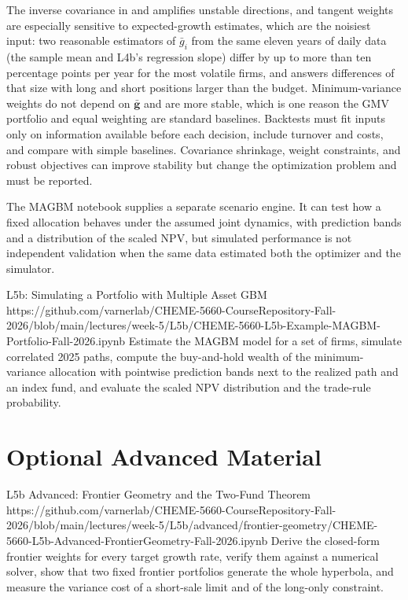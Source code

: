 \documentclass[11pt]{article}
\begin{document}
The inverse covariance in  and  amplifies unstable directions, and tangent weights are especially sensitive to expected-growth estimates, which are the noisiest input: two reasonable estimators of $\bar g_i$ from the same eleven years of daily data (the sample mean and L4b's regression slope) differ by up to more than ten percentage points per year for the most volatile firms, and  answers differences of that size with long and short positions larger than the budget. Minimum-variance weights do not depend on $\bar{\mathbf g}$ and are more stable, which is one reason the GMV portfolio and equal weighting are standard baselines. Backtests must fit inputs only on information available before each decision, include turnover and costs, and compare with simple baselines. Covariance shrinkage, weight constraints, and robust objectives can improve stability but change the optimization problem and must be reported.

The MAGBM notebook supplies a separate scenario engine. It can test how a fixed allocation behaves under the assumed joint dynamics, with prediction bands and a distribution of the scaled NPV, but simulated performance is not independent validation when the same data estimated both the optimizer and the simulator.

\notebooklink
  {L5b: Simulating a Portfolio with Multiple Asset GBM}
  {https://github.com/varnerlab/CHEME-5660-CourseRepository-Fall-2026/blob/main/lectures/week-5/L5b/CHEME-5660-L5b-Example-MAGBM-Portfolio-Fall-2026.ipynb}
  {Estimate the MAGBM model for a set of firms, simulate correlated 2025 paths, compute the buy-and-hold wealth of the minimum-variance allocation with pointwise prediction bands next to the realized path and an index fund, and evaluate the scaled NPV distribution and the trade-rule probability.}

\newpage
\section*{Optional Advanced Material}

\notebooklink
  {L5b Advanced: Frontier Geometry and the Two-Fund Theorem}
  {https://github.com/varnerlab/CHEME-5660-CourseRepository-Fall-2026/blob/main/lectures/week-5/L5b/advanced/frontier-geometry/CHEME-5660-L5b-Advanced-FrontierGeometry-Fall-2026.ipynb}
  {Derive the closed-form frontier weights for every target growth rate, verify them against a numerical solver, show that two fixed frontier portfolios generate the whole hyperbola, and measure the variance cost of a short-sale limit and of the long-only constraint.}
\end{document}
